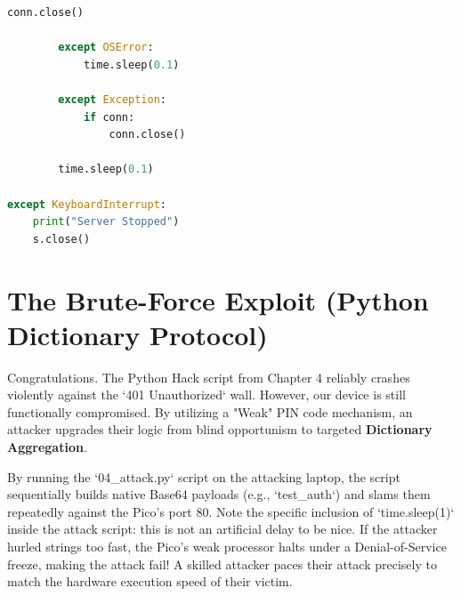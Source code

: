 \begin{lstlisting}[language=Python, caption=04\_weak\_login.py]
            conn.close()

        except OSError:
            time.sleep(0.1)

        except Exception:
            if conn:
                conn.close()

        time.sleep(0.1)

except KeyboardInterrupt:
    print("Server Stopped")
    s.close()
\end{lstlisting}

\section{The Brute-Force Exploit (Python Dictionary Protocol)}

Congratulations. The Python Hack script from Chapter 4 reliably crashes violently against the `401 Unauthorized` wall. However, our device is still functionally compromised. By utilizing a "Weak" PIN code mechanism, an attacker upgrades their logic from blind opportunism to targeted \textbf{Dictionary Aggregation}.

By running the `04\_attack.py` script on the attacking laptop, the script sequentially builds native Base64 payloads (e.g., `test\_auth`) and slams them repeatedly against the Pico's port 80. Note the specific inclusion of `time.sleep(1)` inside the attack script: this is not an artificial delay to be nice. If the attacker hurled strings too fast, the Pico's weak processor halts under a Denial-of-Service freeze, making the attack fail! A skilled attacker paces their attack precisely to match the hardware execution speed of their victim.

